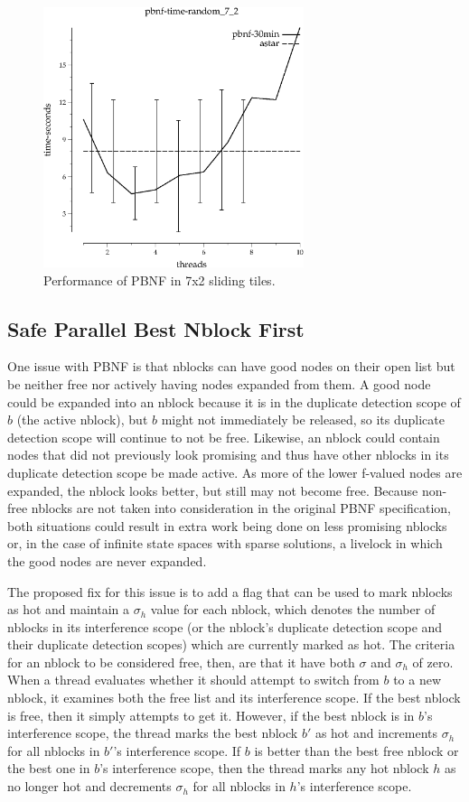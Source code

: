 \documentclass{article}
\begin{document}
\begin{figure}[h!]
\includegraphics[width=3in]{../graphs/seth/tiles-single/PBNF.eps}
\caption{Performance of PBNF in 7x2 sliding tiles.}
\label{fig:PBNF-life}
\end{figure}
\subsection{Safe Parallel Best Nblock First}
One issue with PBNF is that nblocks can have good nodes on their open list but be neither free nor actively having nodes expanded from them. A good node could be expanded into an nblock because it is in the duplicate detection scope of $b$ (the active nblock), but $b$ might not immediately be released, so its duplicate detection scope will continue to not be free. Likewise, an nblock could contain nodes that did not previously look promising and thus have other nblocks in its duplicate detection scope be made active. As more of the lower f-valued nodes are expanded, the nblock looks better, but still may not become free. Because non-free nblocks are not taken into consideration in the original PBNF specification, both situations could result in extra work being done on less promising nblocks or, in the case of infinite state spaces with sparse solutions, a livelock in which the good nodes are never expanded.

The proposed fix for this issue is to add a flag that can be used to mark nblocks as hot and maintain a $\sigma_h$ value for each nblock, which denotes the number of nblocks in its interference scope (or the nblock's duplicate detection scope and their duplicate detection scopes) which are currently marked as hot. The criteria for an nblock to be considered free, then, are that it have both $\sigma$ and $\sigma_h$ of zero. When a thread evaluates whether it should attempt to switch from $b$ to a new nblock, it examines both the free list and its interference scope. If the best nblock is free, then it simply attempts to get it. However, if the best nblock is in $b$'s interference scope, the thread marks the best nblock $b'$ as hot and increments $\sigma_h$ for all nblocks in $b'$'s interference scope. If $b$ is better than the best free nblock or the best one in $b$'s interference scope, then the thread marks any hot nblock $h$ as no longer hot and decrements $\sigma_h$ for all nblocks in $h$'s interference scope.
\end{document}
